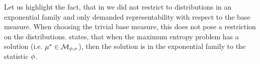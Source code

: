 %
%

Let us highlight the fact, that in  we did not restrict to distributions in an exponential family and only demanded representability with respect to the base measure.
When choosing the trivial base measure, this does not pose a restriction on the distributions.
 states, that when the maximum entropy problem has a solution (i.e. $\mu^*\in\mathcal{M}_{\phi,\nu}$), then the solution is in the exponential family to the statistic $\phi$.

